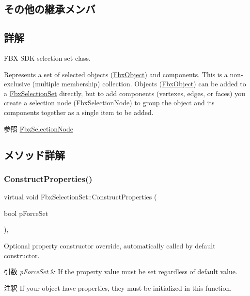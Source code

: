 \subsection*{その他の継承メンバ}


\subsection{詳解}
F\+BX S\+DK selection set class.

Represents a set of selected objects (\hyperlink{class_fbx_object}{Fbx\+Object}) and components. This is a non-\/exclusive (multiple membership) collection. Objects (\hyperlink{class_fbx_object}{Fbx\+Object}) can be added to a \hyperlink{class_fbx_selection_set}{Fbx\+Selection\+Set} directly, but to add components (vertexes, edges, or faces) you create a selection node (\hyperlink{class_fbx_selection_node}{Fbx\+Selection\+Node}) to group the object and its components together as a single item to be added. \begin{DoxySeeAlso}{参照}
\hyperlink{class_fbx_selection_node}{Fbx\+Selection\+Node} 
\end{DoxySeeAlso}


\subsection{メソッド詳解}
\mbox{\label{class_fbx_selection_set_adcb0af5e3ecfd0957fbf0fe6958d8d6b}} 
\subsubsection{\texorpdfstring{Construct\+Properties()}{ConstructProperties()}}
{\footnotesize\ttfamily virtual void Fbx\+Selection\+Set\+::\+Construct\+Properties (\begin{DoxyParamCaption}\item[{bool}]{p\+Force\+Set }\end{DoxyParamCaption})\hspace{0.3cm}{\ttfamily [protected]}, {\ttfamily [virtual]}}

Optional property constructor override, automatically called by default constructor. 
\begin{DoxyParams}{引数}
{\em p\+Force\+Set} & If the property value must be set regardless of default value. \\
\hline
\end{DoxyParams}
\begin{DoxyRemark}{注釈}
If your object have properties, they must be initialized in this function. 
\end{DoxyRemark}


